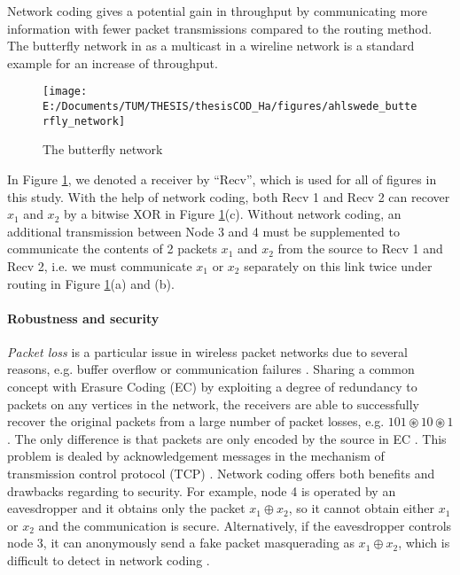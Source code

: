 Network coding gives a potential gain in throughput by communicating
more information with fewer packet transmissions compared to the routing
method. The butterfly network in \cite{Ahlswede:2000} as a multicast
in a wireline network is a standard example for an increase of throughput.
\begin{figure}[H]
\caption{The butterfly network \label{fig:The-butterfly-network}}

\centering{}\texttt{[image: E:/Documents/TUM/THESIS/thesisCOD\_Ha/figures/ahlswede\_butterfly\_network]}
\end{figure}
In Figure \ref{fig:The-butterfly-network}, we denoted a receiver
by ``Recv'', which is used for all of figures in this study. With
the help of network coding, both Recv 1 and Recv 2 can recover $x_{1}$
and $x_{2}$ by a bitwise XOR in Figure \ref{fig:The-butterfly-network}(c).
Without network coding, an additional transmission between Node 3
and 4 must be supplemented to communicate the contents of 2 packets
$x_{1}$ and $x_{2}$ from the source to Recv 1 and Recv 2, i.e. we
must communicate $x_{1}$ or $x_{2}$ separately on this link twice
under routing in Figure \ref{fig:The-butterfly-network}(a) and (b). 

\paragraph{Robustness and security}

\textit{Packet loss} is a particular issue in wireless packet networks
due to several reasons, e.g. buffer overflow or communication failures
\cite{Ho:2008}. Sharing a common concept with Erasure Coding (EC)
by exploiting a degree of redundancy to packets on any vertices in
the network, the receivers are able to successfully recover the original
packets from a large number of packet losses, e.g. $101\circledast10\circledast1$.
The only difference is that packets are only encoded by the source
in EC \cite{Fujimura:2008}. This problem is dealed by acknowledgement
messages in the mechanism of transmission control protocol (TCP) \cite{Ho:2008}.
Network coding offers both benefits and drawbacks regarding to security.
For example, node 4 is operated by an eavesdropper and it obtains
only the packet $x_{1}\oplus x_{2}$, so it cannot obtain either $x_{1}$
or $x_{2}$ and the communication is secure. Alternatively, if the
eavesdropper controls node 3, it can anonymously send a fake packet
masquerading as $x_{1}\oplus x_{2}$, which is difficult to detect
in network coding \cite{Ho:2008}.

